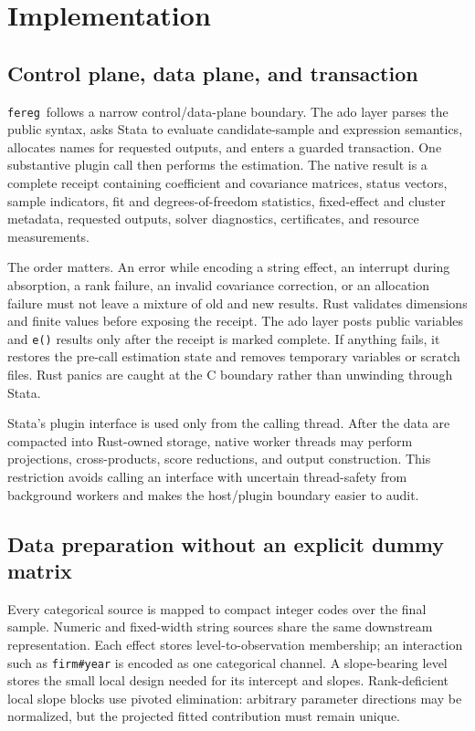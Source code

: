 \documentclass[11pt]{article}
\newcommand{\fereg}{\texttt{fereg}}
\begin{document}
\section{Implementation}
\label{sec:implementation}

\subsection{Control plane, data plane, and transaction}

\fereg\ follows a narrow control/data-plane boundary.  The ado layer parses
the public syntax, asks Stata to evaluate candidate-sample and expression
semantics, allocates names for requested outputs, and enters a guarded
transaction.  One substantive plugin call then performs the estimation.  The
native result is a complete receipt containing coefficient and covariance
matrices, status vectors, sample indicators, fit and degrees-of-freedom
statistics, fixed-effect and cluster metadata, requested outputs, solver
diagnostics, certificates, and resource measurements.

The order matters.  An error while encoding a string effect, an interrupt
during absorption, a rank failure, an invalid covariance correction, or an
allocation failure must not leave a mixture of old and new results.  Rust
validates dimensions and finite values before exposing the receipt.  The ado
layer posts public variables and \texttt{e()} results only after the receipt
is marked complete.  If anything fails, it restores the pre-call estimation
state and removes temporary variables or scratch files.  Rust panics are
caught at the C boundary rather than unwinding through Stata.

Stata's plugin interface is used only from the calling thread.  After the data
are compacted into Rust-owned storage, native worker threads may perform
projections, cross-products, score reductions, and output construction.  This
restriction avoids calling an interface with uncertain thread-safety from
background workers and makes the host/plugin boundary easier to audit.

\subsection{Data preparation without an explicit dummy matrix}

Every categorical source is mapped to compact integer codes over the final
sample.  Numeric and fixed-width string sources share the same downstream
representation.  Each effect stores level-to-observation membership; an
interaction such as \texttt{firm\#year} is encoded as one categorical
channel.  A slope-bearing level stores the small local design needed for its
intercept and slopes.  Rank-deficient local slope blocks use pivoted
elimination: arbitrary parameter directions may be normalized, but the
projected fitted contribution must remain unique.
\end{document}
